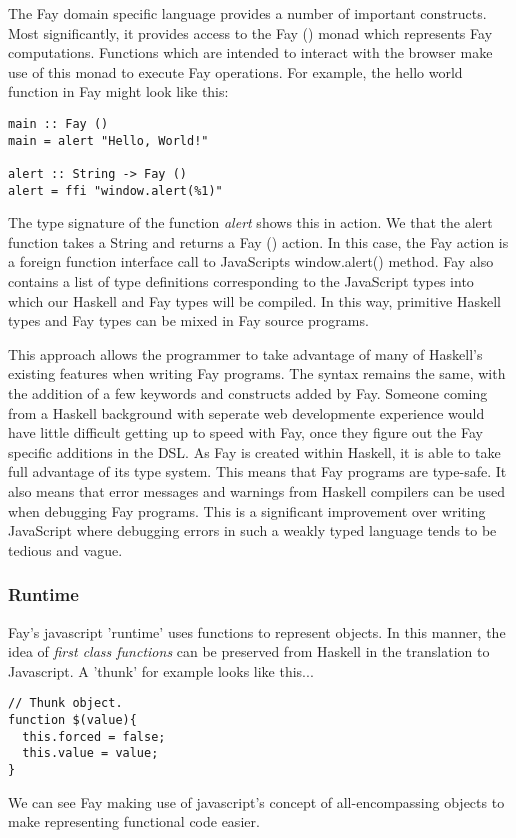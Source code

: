 The Fay domain specific language provides a number of important 
constructs. Most significantly, it provides access to the Fay () monad
which represents Fay computations. Functions which are intended to interact
with the browser make use of this monad to execute Fay operations. For
example, the hello world function in Fay might look like this:

\begin{verbatim}
main :: Fay ()
main = alert "Hello, World!"

alert :: String -> Fay ()
alert = ffi "window.alert(%1)"
\end{verbatim}

The type signature of the function \emph{alert} shows this in action.
We that the alert function takes a String and returns a Fay () action.
In this case, the Fay action is a foreign function interface call to
JavaScripts window.alert() method.  Fay also contains a list of type 
definitions corresponding to the JavaScript types into which our Haskell
and Fay types will be compiled. In this way, primitive Haskell types and 
Fay types can be mixed in Fay source programs. 

This approach allows the programmer to take advantage of many of Haskell's
existing features when writing Fay programs. The syntax remains the same,
with the addition of a few keywords and constructs added by Fay. Someone
coming from a Haskell background with seperate web developmente experience
would have little difficult getting up to speed with Fay, once they figure
out the Fay specific additions in the DSL. As Fay is created within Haskell,
it is able to take full advantage of its type system. This means that Fay
programs are type-safe. It also means that error messages and warnings from 
Haskell compilers can be used when debugging Fay programs. This is a significant
improvement over writing JavaScript where debugging errors in such a weakly
typed language tends to be tedious and vague. 

\subsubsection{Runtime}

Fay's javascript 'runtime' uses functions to represent objects. In this manner,
the idea of \emph{first class functions} can be preserved from Haskell in the
translation to Javascript. A 'thunk' for example looks like this...
\begin{verbatim}
// Thunk object.
function $(value){
  this.forced = false;
  this.value = value;
}
\end{verbatim}
We can see Fay making use of javascript's concept of all-encompassing objects to
make representing functional code easier. 

